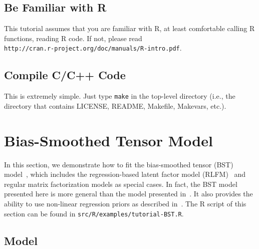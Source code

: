 \documentclass[10pt]{article}
\begin{document}
\subsection{Be Familiar with R}

This tutorial assumes that you are familiar with R, at least comfortable calling R functions, reading R code.  If not, please read \\
{\tt http://cran.r-project.org/doc/manuals/R-intro.pdf}.

\subsection{Compile C/C++ Code}

This is extremely simple.  Just type {\tt make} in the top-level directory (i.e., the directory that contains LICENSE, README, Makefile, Makevars, etc.).

\section{Bias-Smoothed Tensor Model}

In this section, we demonstrate how to fit the bias-smoothed tensor (BST) model~\cite{bst:kdd11}, which includes the regression-based latent factor model (RLFM)~\cite{rlfm:kdd09} and regular matrix factorization models as special cases.  In fact, the BST model presented here is more general than the model presented in~\cite{bst:kdd11}.  It also provides the ability to use non-linear regression priors as described in~\cite{gmf:recsys11}.  The R script of this section can be found in {\tt src/R/examples/tutorial-BST.R}.

\subsection{Model}
\end{document}
